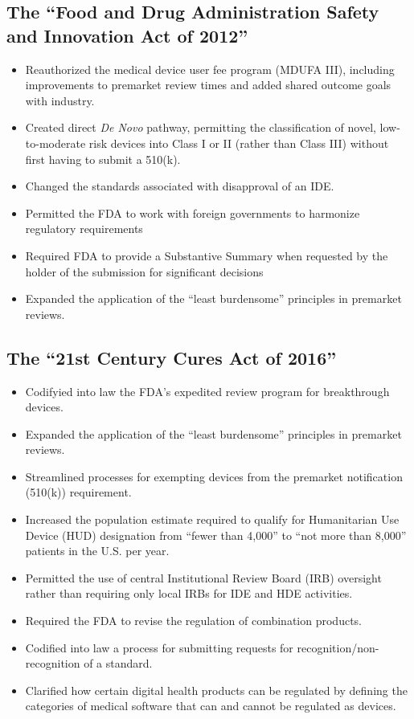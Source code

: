 \documentclass[11pt]{book}
\begin{document}
\subsection{The ``Food and Drug Administration Safety and Innovation Act of 2012''}
\begin{itemize}
	\item Reauthorized the medical device user fee program (MDUFA III), including improvements to premarket review times and added shared outcome goals with industry.
	\item Created direct \textit{De Novo} pathway, permitting the classification of novel, low-to-moderate risk devices into Class I or II (rather than Class III) without first having to submit a 510(k).
	\item Changed the standards associated with disapproval of an IDE.
	\item Permitted the FDA to work with foreign governments to harmonize regulatory requirements
	\item Required FDA to provide a Substantive Summary when requested by the holder of the submission for significant decisions
	\item Expanded the application of the ``least burdensome'' principles in premarket reviews.
\end{itemize}

\subsection{The ``21st Century Cures Act of 2016''}
\begin{itemize}
	\item Codifyied into law the FDA’s expedited review program for breakthrough devices.
	\item Expanded the application of the ``least burdensome'' principles in premarket reviews.
	\item Streamlined processes for exempting devices from the premarket notification (510(k)) requirement.
	\item Increased the population estimate required to qualify for Humanitarian Use Device (HUD) designation from ``fewer than 4,000'' to ``not more than 8,000'' patients in the U.S. per year.
	\item Permitted the use of central Institutional Review Board (IRB) oversight rather than requiring only local IRBs for IDE and HDE activities.
	\item Required the FDA to revise the regulation of combination products.
	\item Codified into law a process for submitting requests for recognition/non-recognition of a standard.
	\item Clarified how certain digital health products can be regulated by defining the categories of medical software that can and cannot be regulated as devices.
\end{itemize}
\end{document}
